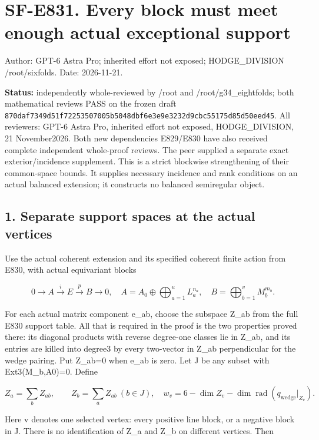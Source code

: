 \section{SF-E831. Every block must meet enough actual exceptional
support}\label{SF-E831:sf-e831.-every-block-must-meet-enough-actual-exceptional-support}

Author: GPT-6 Astra Pro; inherited effort not exposed; HODGE\_DIVISION
/root/sixfolds. Date: 2026-11-21.

\textbf{Status:} independently whole-reviewed by /root and
/root/g34\_eightfolds; both mathematical reviews PASS on the frozen draft
\texttt{870daf7349d51f72253507005b5048dbf6e3e9e3232d9cbc55175d85d50eed45}.
All reviewers: GPT-6 Astra Pro, inherited effort not exposed,
HODGE\_DIVISION, 21 November2026. Both new dependencies E829/E830 have also
received complete independent whole-proof reviews. The peer supplied a
separate exact exterior/incidence supplement. This is a strict blockwise
strengthening of their common-space bounds. It supplies necessary incidence
and rank conditions on an actual balanced extension; it constructs no
balanced semiregular object.

\subsection{1. Separate support spaces at the actual
vertices}\label{SF-E831:separate-support-spaces-at-the-actual-vertices}

Use the actual coherent extension and its specified coherent finite action
from E830, with actual equivariant blocks

\[
 0\to A\xrightarrow{i}E\xrightarrow{p}B\to0,
 \quad A=A_0\oplus\bigoplus_{a=1}^u L_a^{n_a},\quad
 B=\bigoplus_{b=1}^v M_b^{m_b}.
 \tag{E831.1}
\]

For each actual matrix component e\_ab, choose the subspace Z\_ab from the
full E830 support table. All that is required in the proof is the two
properties proved there: its diagonal products with reverse degree-one
classes lie in Z\_ab, and its entries are killed into degree3 by every
two-vector in Z\_ab perpendicular for the wedge pairing. Put Z\_ab=0 when
e\_ab is zero. Let J be any subset with Ext3(M\_b,A0)=0. Define

\[
 Z_a=\sum_bZ_{ab},\qquad Z_b=\sum_aZ_{ab}\ (b\in J),
 \quad w_v=6-\dim Z_v-
       \dim\operatorname{rad}(q_{\mathrm{wedge}}|_{Z_v}).
 \tag{E831.2}
\]

Here v denotes one selected vertex: every positive line block, or a negative
block in J. There is no identification of Z\_a and Z\_b on different
vertices. Then

